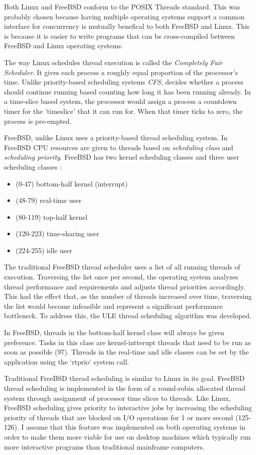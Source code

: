 	Both Linux and FreeBSD conform to the POSIX Threads standard.  This was probably chosen because  having multiple operating systems support a common interface for concurrency is mutually benefical to both FreeBSD and Linux.  This is because it is easier to write programs that can be cross-compiled between FreeBSD and Linux operating systems.

	The way Linux schedules thread execution is called the \textit{Completely Fair Scheduler}.  It gives each process a roughly equal proportion of the processor's time.  Unlike priority-based scheduling systems \textit{CFS}, decides whether a process should continue running based counting how long it has been running already.  In a time-slice based system, the processor would assign a process a countdown timer for the 'timeslice' that it can run for.  When that timer ticks to zero, the process is pre-empted.

	FreeBSD, unlike Linux uses a priority-based thread scheduling system.  In FreeBSD CPU resources are given to threads based on \textit{scheduling class} and \textit{scheduling priority}.  FreeBSD has two kernel scheduling classes and three user scheduling classes \cite{freebsd} :
		\begin{itemize}
			\item (0-47) bottom-half kernel (interrupt)
			\item (48-79) real-time user
			\item (80-119) top-half kernel
			\item (120-223) time-sharing user
			\item (224-255) idle user
		\end{itemize}

	The traditional FreeBSD thread scheduler uses a list of all running threads of execution.  Traversing the list once per second, the operating system analyzes thread performance and requirements and adjusts thread priorities accordingly.  This had the effect that, as the number of threads increased over time, traversing the list would become infeasible and represent a significant performance bottleneck.  To address this, the ULE thread scheduling algorithm was developed.

	In FreeBSD, threads in the bottom-half kernel class will always be given preference.  Tasks in this class are kernel-intterupt threads that need to be run as soon as possible (97).  Threads in the real-time and idle classes can be set by the application using the `rtprio` system call.

	Traditional FreeBSD thread scheduling is similar to Linux in its goal.  FreeBSD thread scheduling is implemented in the form of a round-robin allocated thread system through assignment of processor time slices to threads.  Like Linux, FreeBSD scheduling gives priority to interactive jobs by increasing the scheduling priority of threads that are blocked on I/O operations for 1 or more second (125-126).  
	I assume that this feature was implemented on both operating systems in order to make them more viable for use on desktop machines which typically run more interactive programs than traditional mainframe computers.

